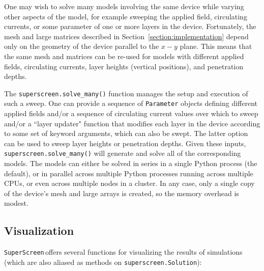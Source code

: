 \documentclass[preprint,12pt]{elsarticle}
\newcommand{\SuperScreen}{\texttt{SuperScreen}\,}
\begin{document}
One may wish to solve many models involving the same device while varying other aspects of the model, for example sweeping the applied field, circulating currents, or some parameter of one or more layers in the device. Fortunately, the mesh and large matrices described in Section~\ref{section:implementation} depend only on the geometry of the device parallel to the $x-y$ plane. This means that the same mesh and matrices can be re-used for models with different applied fields, circulating currents, layer heights (vertical positions), and penetration depths.

The \texttt{superscreen.solve_many()} function manages the setup and execution of such a sweep. One can provide a sequence of \texttt{Parameter} objects defining different applied fields and/or a sequence of circulating current values over which to sweep and/or a ``layer updater" function that modifies each layer in the device according to some set of keyword arguments, which can also be swept. The latter option can be used to sweep layer heights or penetration depths. Given these inputs, \texttt{superscreen.solve_many()} will generate and solve all of the corresponding models. The models can either be solved in series in a single Python process (the default), or in parallel across multiple Python processes running across multiple CPUs, or even across multiple nodes in a cluster. In any case, only a single copy of the device's mesh and large arrays is created, so the memory overhead is modest.

\subsection{Visualization}
\label{section:overview:visualization}

\SuperScreen offers several functions for visualizing the results of simulations (which are also aliased as methods on \texttt{superscreen.Solution}):
\end{document}
